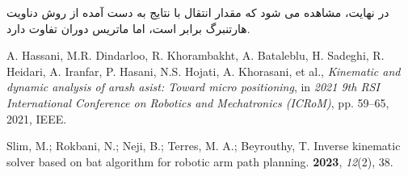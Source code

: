 در نهایت، مشاهده می شود که مقدار انتقال با نتایج به دست آمده از روش دناویت هارتنبرگ برابر است، اما ماتریس دوران تفاوت دارد.

 


\begin{thebibliography}{9}
	
	A. Hassani, M.R. Dindarloo, R. Khorambakht, A. Bataleblu, H. Sadeghi, R. Heidari, A. Iranfar, P. Hasani, N.S. Hojati, A. Khorasani, et al.,
	\textit{Kinematic and dynamic analysis of arash asist: Toward micro positioning}, 
	in \textit{2021 9th RSI International Conference on Robotics and Mechatronics (ICRoM)}, 
	pp. 59--65, 2021, IEEE.
	
	Slim, M.; Rokbani, N.; Neji, B.; Terres, M. A.; Beyrouthy, T.
	\newblock Inverse kinematic solver based on bat algorithm for robotic arm path planning.
	 \textbf{2023}, {\em 12}(2), 38.
	
\end{thebibliography}

